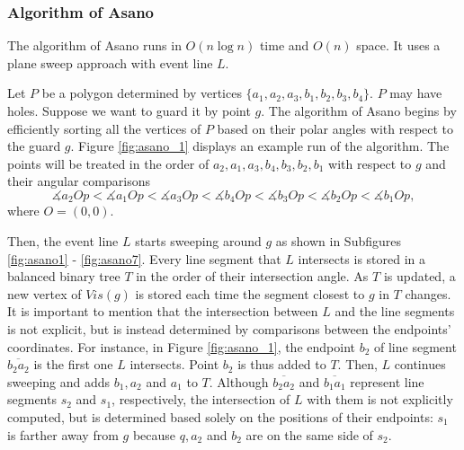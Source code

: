 \subsubsection{Algorithm of Asano}
The algorithm of Asano \cite{asano1985efficient} runs in $O(n \log n)$ time and $O(n)$ space. It uses a plane sweep approach with event line $L$. 

Let $P$ be a polygon determined by vertices $\{a_1, a_2, a_3, b_1, b_2, b_3, b_4\}$. $P$ may have holes. Suppose we want to guard it by point $g$. The algorithm of Asano \cite{asano1985efficient} begins by efficiently sorting all the vertices of $P$ based on their polar angles with respect to the guard $g$. Figure \ref{fig:asano_1} displays an example run of the algorithm. The points will be treated in the order of $a_2, a_1, a_3, b_4, b_3, b_2, b_1$ with respect to $g$ and their angular comparisons $$\measuredangle a_2Op < \measuredangle a_1Op < \measuredangle a_3Op < \measuredangle b_4Op < \measuredangle b_3Op < \measuredangle b_2Op < \measuredangle b_1Op,$$ where $O = (0, 0)$.


Then, the event line $L$ starts sweeping around $g$ as shown in Subfigures \ref{fig:asano1} - \ref{fig:asano7}. Every line segment that $L$ intersects is stored in a balanced binary tree $T$ in the order of their intersection angle. As $T$ is updated, a new vertex of $\mathit{Vis}(g)$ is stored each time the segment closest to $g$ in $T$ changes. It is important to mention that the intersection between $L$ and the line segments is not explicit, but is instead determined by comparisons between the endpoints' coordinates. For instance, in Figure \ref{fig:asano_1}, the endpoint $b_2$ of line segment $\overline{b_2a_2}$ is the first one $L$ intersects. Point $b_2$ is thus added to $T$. Then, $L$ continues sweeping and adds $b_1, a_2$ and $a_1$ to $T$. Although $\overline{b_2a_2}$ and $\overline{b_1a_1}$ represent line segments $s_2$ and $s_1$, respectively, the intersection of $L$ with them is not explicitly computed, but is determined based solely on the positions of their endpoints: $s_1$ is farther away from $g$ because $q, a_2$ and $b_2$ are on the same side of $s_2$.

